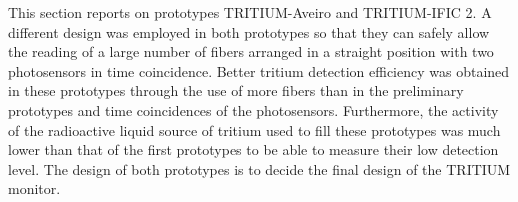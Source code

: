 This section reports on prototypes TRITIUM-Aveiro and TRITIUM-IFIC 2. A different design was employed in both prototypes so that they can safely allow the reading of a large number of fibers arranged in a straight position with two photosensors in time coincidence. Better tritium detection efficiency was obtained in these prototypes through the use of more fibers than in the preliminary prototypes and time coincidences of the photosensors. Furthermore, the activity of the radioactive liquid source of tritium used to fill these prototypes was much lower than that of the first prototypes to be able to measure their low detection level. The design of both prototypes is to decide the final design of the TRITIUM monitor.
